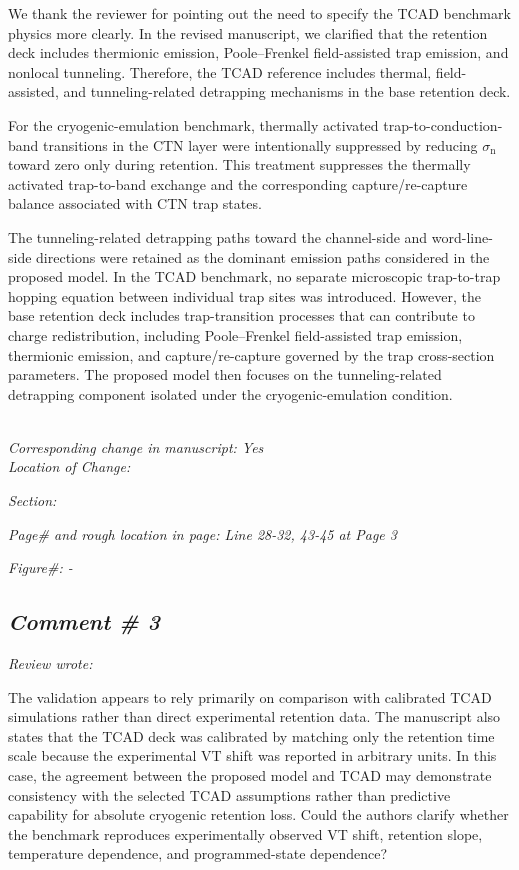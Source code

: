 \documentclass[11pt]{article}
\begin{document}
We thank the reviewer for pointing out the need to specify the TCAD benchmark physics more clearly.
In the revised manuscript, we clarified that the retention deck includes thermionic emission, Poole--Frenkel field-assisted trap emission, and nonlocal tunneling.
Therefore, the TCAD reference includes thermal, field-assisted, and tunneling-related detrapping mechanisms in the base retention deck.

For the cryogenic-emulation benchmark, thermally activated trap-to-conduction-band transitions in the CTN layer were intentionally suppressed by reducing $\sigma_\mathrm{n}$ toward zero only during retention.
This treatment suppresses the thermally activated trap-to-band exchange and the corresponding capture/re-capture balance associated with CTN trap states.

The tunneling-related detrapping paths toward the channel-side and word-line-side directions were retained as the dominant emission paths considered in the proposed model.
In the TCAD benchmark, no separate microscopic trap-to-trap hopping equation between individual trap sites was introduced.
However, the base retention deck includes trap-transition processes that can contribute to charge redistribution, including Poole--Frenkel field-assisted trap emission, thermionic emission, and capture/re-capture governed by the trap cross-section parameters.
The proposed model then focuses on the tunneling-related detrapping component isolated under the cryogenic-emulation condition.

\noindent \textit{\\Corresponding change in manuscript: Yes \\Location of Change:}

\hspace{40pt} \noindent \textit{Section: \uppercase\expandafter{}}

\hspace{40pt} \noindent \textit{Page\# and rough location in page: Line 28-32, 43-45 at Page 3}

\hspace{40pt} \noindent \textit{Figure\#: - }

\subsection*{\textit{Comment \# 3}}

\noindent \textit{Review wrote: }

The validation appears to rely primarily on comparison with calibrated TCAD simulations rather than direct experimental retention data.
The manuscript also states that the TCAD deck was calibrated by matching only the retention time scale because the experimental VT shift was reported in arbitrary units.
In this case, the agreement between the proposed model and TCAD may demonstrate consistency with the selected TCAD assumptions rather than predictive capability for absolute cryogenic retention loss.
Could the authors clarify whether the benchmark reproduces experimentally observed VT shift, retention slope, temperature dependence, and programmed-state dependence?
\end{document}

